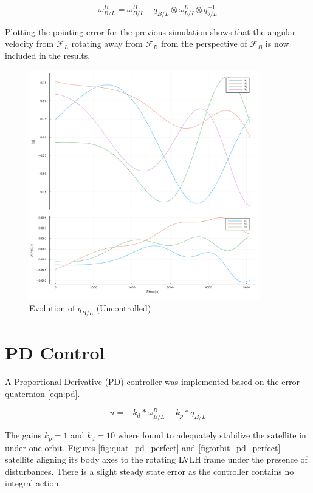 \documentclass{article}
\begin{document}
\begin{equation}
	\omega_{B/L}^B = \omega_{B/I}^{B} - q_{B/L} \otimes \omega_{L/I}^{L} \otimes q_{b/L}^{-1}
	\label{eqn:w_b_lvlh}
\end{equation}

Plotting the pointing error for the previous simulation shows that the angular velocity from $\mathcal{F}_L$ rotating away from $\mathcal{F}_B$ from the perspective of $\mathcal{F}_B$ is now included in the results.

\begin{figure}[h]
	\centering
	\includegraphics[width=10cm]{images/dist_attitude_lvlh}
	\caption{Evolution of $q_{B/L}$ (Uncontrolled)}
\end{figure}

\section{PD Control}

A Proportional-Derivative (PD) controller was implemented based on the error quaternion \ref{eqn:pd}. 

\begin{equation}
	u = -k_d * \omega_{B/L}^{B} - k_p * q_{B/L}
	\label{eqn:pd}
\end{equation}

The gains $k_p = 1$ and $k_d = 10$ where found to adequately stabilize the satellite in under one orbit. Figures \ref{fig:quat_pd_perfect} and \ref{fig:orbit_pd_perfect} satellite aligning its body axes to the rotating LVLH frame under the presence of disturbances. There is a slight steady state error as the controller contains no integral action.
\end{document}
